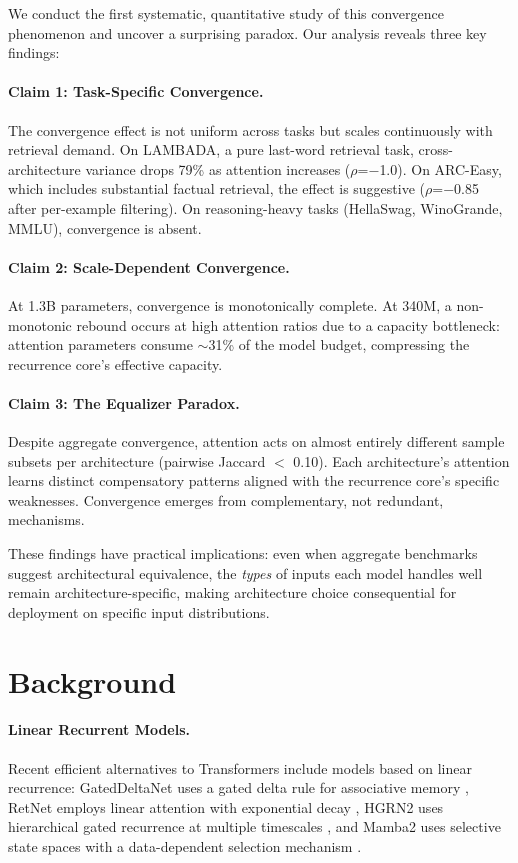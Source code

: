 \documentclass[11pt,twocolumn,a4paper]{article}
\begin{document}
We conduct the first systematic, quantitative study of this convergence phenomenon and uncover a surprising paradox. Our analysis reveals three key findings:

\paragraph{Claim 1: Task-Specific Convergence.} The convergence effect is not uniform across tasks but scales continuously with retrieval demand. On LAMBADA, a pure last-word retrieval task, cross-architecture variance drops 79\% as attention increases ($\rho$=$-$1.0). On ARC-Easy, which includes substantial factual retrieval, the effect is suggestive ($\rho$=$-$0.85 after per-example filtering). On reasoning-heavy tasks (HellaSwag, WinoGrande, MMLU), convergence is absent.

\paragraph{Claim 2: Scale-Dependent Convergence.} At 1.3B parameters, convergence is monotonically complete. At 340M, a non-monotonic rebound occurs at high attention ratios due to a capacity bottleneck: attention parameters consume $\sim$31\% of the model budget, compressing the recurrence core's effective capacity.

\paragraph{Claim 3: The Equalizer Paradox.} Despite aggregate convergence, attention acts on almost entirely different sample subsets per architecture (pairwise Jaccard $<$ 0.10). Each architecture's attention learns distinct compensatory patterns aligned with the recurrence core's specific weaknesses. Convergence emerges from complementary, not redundant, mechanisms.

These findings have practical implications: even when aggregate benchmarks suggest architectural equivalence, the \emph{types} of inputs each model handles well remain architecture-specific, making architecture choice consequential for deployment on specific input distributions.

\section{Background}

\paragraph{Linear Recurrent Models.} Recent efficient alternatives to Transformers include models based on linear recurrence: GatedDeltaNet uses a gated delta rule for associative memory \cite{yang2024gated}, RetNet employs linear attention with exponential decay \cite{sun2023retentive}, HGRN2 uses hierarchical gated recurrence at multiple timescales \cite{qin2024hgrn2}, and Mamba2 uses selective state spaces with a data-dependent selection mechanism \cite{dao2024transformers}.
\end{document}
